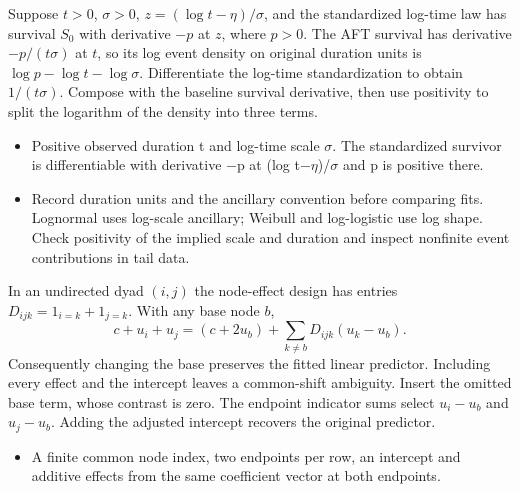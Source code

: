 \expandafter\def\csname statadic@statement@STATADIC-SURVIVAL-002\endcsname{Suppose $t>0$, $\sigma>0$, $z=(\log t-\eta)/\sigma$,
  and the standardized log-time law has survival $S_0$ with derivative
  $-p$ at $z$, where $p>0$. The AFT survival has derivative
  $-p/(t\sigma)$ at $t$, so its log event density on original duration units
  is $\log p-\log t-\log\sigma$.}
\expandafter\def\csname statadic@proof@STATADIC-SURVIVAL-002\endcsname{Differentiate the log-time standardization to obtain
  $1/(t\sigma)$. Compose with the baseline survival derivative, then use
  positivity to split the logarithm of the density into three terms.}
\expandafter\def\csname statadic@assumptions@STATADIC-SURVIVAL-002\endcsname{\begin{itemize}
\item Positive observed duration t and log-time scale \ensuremath{\sigma}. The standardized survivor is differentiable with derivative \ensuremath{-}p at (log t\ensuremath{-}\ensuremath{\eta})/\ensuremath{\sigma} and p is positive there.
\end{itemize}}
\expandafter\def\csname statadic@diagnostics@STATADIC-SURVIVAL-002\endcsname{\begin{itemize}
\item Record duration units and the ancillary convention before comparing fits. Lognormal uses log-scale ancillary; Weibull and log-logistic use log shape. Check positivity of the implied scale and duration and inspect nonfinite event contributions in tail data.
\end{itemize}}
\expandafter\def\csname statadic@statement@STATADIC-DYADIC-001\endcsname{In an undirected dyad $(i,j)$ the node-effect design
  has entries $D_{ijk}=1_{i=k}+1_{j=k}$. With any base node $b$,
  \[
    c+u_i+u_j=(c+2u_b)+\sum_{k\ne b}D_{ijk}(u_k-u_b).
  \]
  Consequently changing the base preserves the fitted linear predictor.
  Including every effect and the intercept leaves a common-shift ambiguity.}
\expandafter\def\csname statadic@proof@STATADIC-DYADIC-001\endcsname{Insert the omitted base term, whose contrast is zero.
  The endpoint indicator sums select $u_i-u_b$ and $u_j-u_b$.
  Adding the adjusted intercept recovers the original predictor.}
\expandafter\def\csname statadic@assumptions@STATADIC-DYADIC-001\endcsname{\begin{itemize}
\item A finite common node index, two endpoints per row, an intercept and additive effects from the same coefficient vector at both endpoints.
\end{itemize}}
